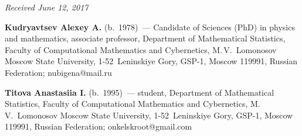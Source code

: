\vspace*{-6pt}

\hfill{\small\textit{Received June 12, 2017}}


\Contr

\noindent
\textbf{Kudryavtsev Alexey A.} (b.\ 1978)~--- 
Candidate of Sciences (PhD) in physics and mathematics, associate professor, 
Department of Mathematical Statistics, Faculty of Computational Mathematics 
and Cybernetics, M.\,V.~Lomonosov Moscow State University, 1-52~Leninskiye Gory, 
GSP-1, Moscow 119991, Russian Federation; \mbox{nubigena@mail.ru}

\vspace*{3pt}

\noindent
\textbf{Titova Anastasiia I.} (b.\ 1995)~--- 
student, Department of Mathematical Statistics, Faculty of Computational 
Mathematics and Cybernetics, M.\,V.~Lomonosov Moscow State University, 
1-52~Leninskiye Gory, GSP-1, Moscow 119991, Russian Federation; 
\mbox{onkelskroot@gmail.com}
\label{end\stat}


\renewcommand{\bibname}{\protect\rm Литература} 